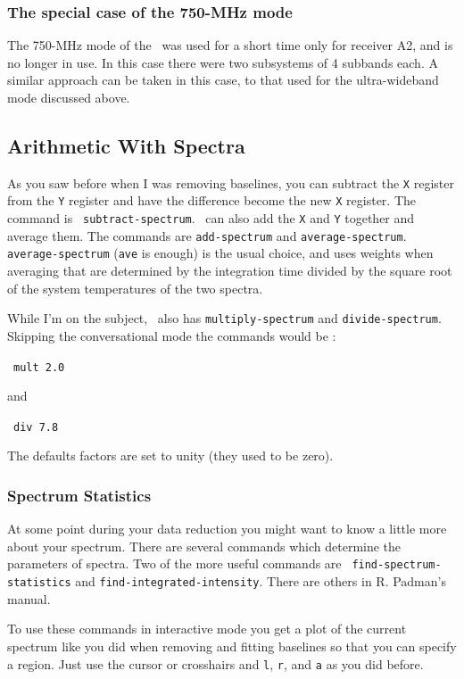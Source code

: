 \subsubsection{The special case of the 750-MHz mode}
The 750-MHz mode of the \das\ was used for a short time only for
receiver A2, and is no longer in use. In this case there were two
subsystems of 4 subbands each. A similar approach can be taken in this
case, to that used for the ultra-wideband mode discussed above.

\subsection{Arithmetic With Spectra}
\label{sec:specx_8.1}

As you saw before when I was removing baselines, you can subtract the
{\tt X} register from the {\tt Y} register and have the difference
become the new {\tt X} register.  The command is {\tt
subtract-spectrum}.  \SPECX\ can also add the {\tt X} and {\tt Y}
together and average them.  The commands are {\tt add-spectrum} and
{\tt average-spectrum}.  {\tt average-spectrum} ({\tt{ave}} is enough)
is the usual choice, and uses weights when averaging that are
determined by the integration time divided by the square root of the
system temperatures of the two spectra.

While I'm on the subject, \SPECX\ also has {\tt multiply-spectrum} and
{\tt divide-spectrum}.  Skipping the conversational mode the commands
would be \eg :

\SP\ \verb|mult 2.0|

and

\SP\ \verb|div 7.8|

The defaults factors are set to unity (they used to be zero). 

\subsubsection{Spectrum Statistics}
\label{sec:specx_10}
At some point during your data reduction you might want to know a little more
about your spectrum.  There are several commands which determine the
parameters of spectra.  Two of the more useful commands are {\tt
find-spectrum-statistics} and {\tt find-integrated-intensity}.  There are
others in R. Padman's manual.

To use these commands in interactive mode you get a plot of the
current spectrum like you did when removing and fitting baselines so
that you can specify a region.  Just use the cursor or crosshairs and
{\tt l}, {\tt r}, and {\tt a} as you did before.


